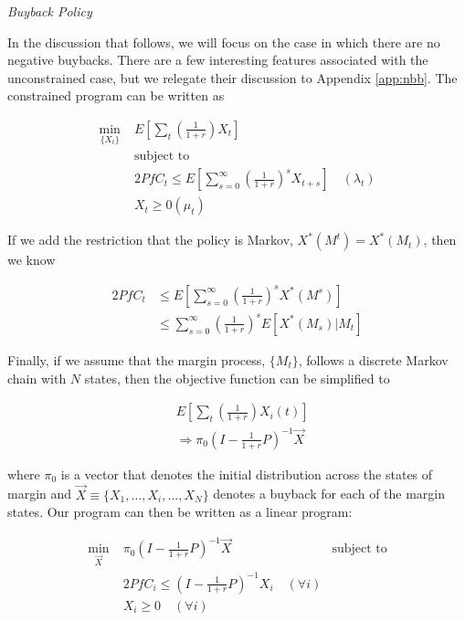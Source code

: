 \textit{Buyback Policy}

In the discussion that follows, we will focus on the case in which there are no negative buybacks.
There are a few interesting features associated with the unconstrained case, but we relegate their
discussion to Appendix \ref{app:nbb}. The constrained program can be written as

\begin{align*}
  \min_{\{X_t\}} \; & E \left[ \sum_{t} \left(\frac{1}{1 + r} \right) X_t \right] \\
  &\text{subject to} \\
  \quad & 2 PfC_t \leq E \left[ \sum_{s=0}^{\infty} \left(\frac{1}{1 + r}\right)^s X_{t+s} \right] \quad (\lambda_t) \\
  \quad & X_t \geq 0 (\mu_t)
\end{align*}

If we add the restriction that the policy is Markov, $X^*(M^t) = X^*(M_t)$, then we know

\begin{align*}
  2 PfC_t &\leq E \left[ \sum_{s=0}^{\infty} \left( \frac{1}{1+r} \right)^s X^*(M^s) \right] \\
  &\leq \sum_{s=0}^{\infty} \left( \frac{1}{1+r} \right)^s E \left[X^*(M_s) | M_t \right]
\end{align*}

Finally, if we assume that the margin process, $\{M_t\}$, follows a discrete Markov chain with $N$
states, then the objective function can be simplified to

\begin{align*}
  &E \left[ \sum_{t} \left(\frac{1}{1 + r} \right) X_i(t) \right] \\
  &\Rightarrow \pi_0 (I - \frac{1}{1+r}P)^{-1} \vec{X}
\end{align*}

where $\pi_0$ is a vector that denotes the initial distribution across the states of margin and
$\vec{X} \equiv \{X_1, \dots, X_i, \dots, X_N\}$ denotes a buyback for each of the margin states.
Our program can then be written as a linear program:

\begin{align*}
  \min_{\vec{X}} \; & \pi_0 (I - \frac{1}{1+r}P)^{-1} \vec{X}
  &\text{subject to} \\
  \quad & 2 PfC_i \leq (I - \frac{1}{1 + r}P)^{-1} X_i \quad (\forall i) \\
  \quad & X_i \geq 0 \quad (\forall i)
\end{align*}

